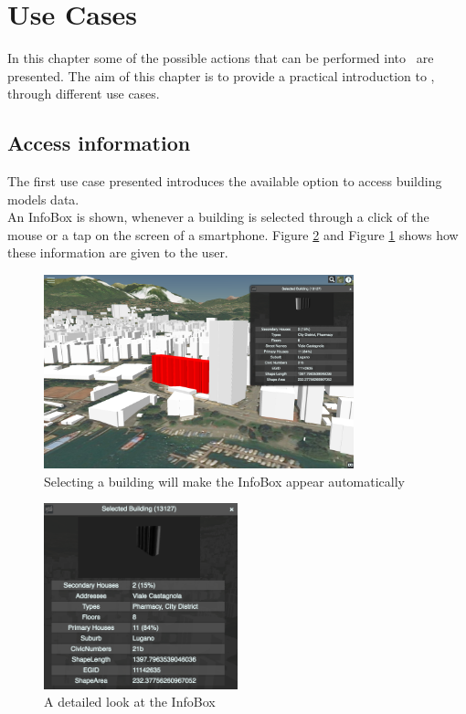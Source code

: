 \section{Use Cases} \label{useCases}
In this chapter some of the possible actions that can be performed into \applicationName\ are presented. The aim of this chapter is to provide a practical introduction to \applicationName, through different use cases.
\subsection{Access information}
The first use case presented introduces the available option to access building models data.\\
An InfoBox is shown, whenever a building is selected through a click of the mouse or a tap on the screen of a smartphone. Figure \ref{subfig:infoBox} and Figure \ref{subfig:infoBox_city} shows how these information are given to the user.\\
\begin{figure} [h]
\centering
	\includegraphics[width=0.8\textwidth]{chapter4/images/infoBox_city}
	\caption{Selecting a building will make the InfoBox appear automatically}
	\label{subfig:infoBox_city}
	\end{figure}
\begin{figure} [h]
	\centering
	\includegraphics[width=0.5\textwidth]{chapter4/images/infoBox}
	\caption{A detailed look at the InfoBox}
	\label{subfig:infoBox}
\end{figure}
